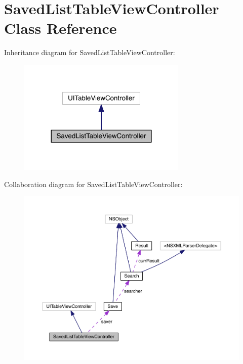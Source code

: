 \section{Saved\+List\+Table\+View\+Controller Class Reference}
\label{interface_saved_list_table_view_controller}


Inheritance diagram for Saved\+List\+Table\+View\+Controller\+:
\nopagebreak
\begin{figure}[H]
\begin{center}
\leavevmode
\includegraphics[width=228pt]{interface_saved_list_table_view_controller__inherit__graph}
\end{center}
\end{figure}


Collaboration diagram for Saved\+List\+Table\+View\+Controller\+:
\nopagebreak
\begin{figure}[H]
\begin{center}
\leavevmode
\includegraphics[width=350pt]{interface_saved_list_table_view_controller__coll__graph}
\end{center}
\end{figure}
